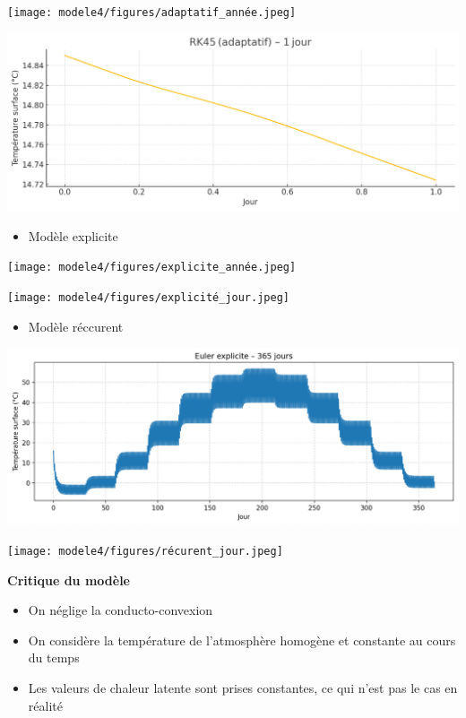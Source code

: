 \documentclass[a4paper,12pt]{article}
\begin{document}
\begin{center}
  \texttt{[image: modele4/figures/adaptatif\_année.jpeg]}
  \end{center}
\begin{center}
  \includegraphics[width=0.8\linewidth]{modele4/figures/adaptatif_jour.jpeg}
  \end{center}
\begin{itemize}
    \item Modèle explicite
\end{itemize}


\begin{center}
  \texttt{[image: modele4/figures/explicite\_année.jpeg]}
  \end{center}
\begin{center}
  \texttt{[image: modele4/figures/explicité\_jour.jpeg]}
  \end{center}
\begin{itemize}
    \item Modèle réccurent
\end{itemize}

\begin{center}
  \includegraphics[width=0.8\linewidth]{modele4/figures/récurrent_année.jpeg}
  \end{center}
\begin{center}
  \texttt{[image: modele4/figures/récurent\_jour.jpeg]}
  \end{center}
\vspace{1cm}


\textbf{Critique du modèle}
\begin{itemize}
    \item On néglige la conducto-convexion
    \item On considère la température de l'atmosphère homogène et constante au cours du temps
    \item Les valeurs de chaleur latente sont prises constantes, ce qui n'est pas le cas en réalité
\end{itemize}
\end{document}
